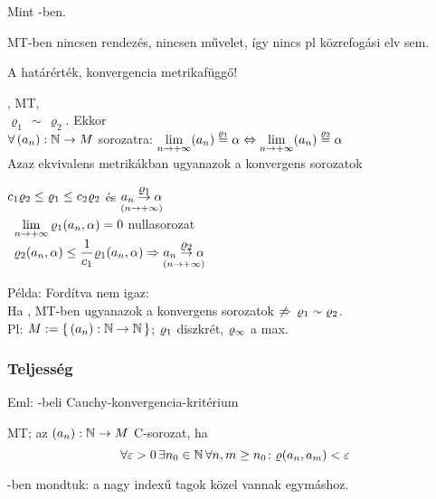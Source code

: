 \begin{biz}Mint \R-ben.
\end{biz}
\begin{Megj}
\item MT-ben nincsen rendezés, nincsen művelet, így nincs pl
  közrefogási elv sem.
\item A határérték, konvergencia metrikafüggő!
\end{Megj}

\begin{te}, 
  MT, \\$\varrho_1\,\sim\,\varrho_2$. Ekkor\\
  $\forall\,(a_n): \mathbb{N}\to M$ sorozatra: $\displaystyle\lim_{n\to+\infty}(a_n)
  \stackrel{\varrho_1}{=} \alpha \Leftrightarrow
  \displaystyle\lim_{n\to+\infty}(a_n) \stackrel{\varrho_2}{=} \alpha$\\
  Azaz ekvivalens metrikákban ugyanazok a konvergens sorozatok   
\end{te}

\begin{biz}
  $c_1 \varrho_2 \leq \varrho_1\leq c_2\varrho_2$ és
  $\underset{(n\to+\infty)}{a_n\overset{\displaystyle\varrho_1}{\to}\alpha}$\\
  \nn\ $\displaystyle\lim_{n\to+\infty}\varrho_1(a_n,\alpha)=0$ nullasorozat\\
  \nn\ $\varrho_2(a_n,\alpha)\leq \dfrac1{c_1}\varrho_1(a_n,\alpha)
  \Rightarrow \underset{(n\to+\infty)}{a_n\overset{\displaystyle\varrho_2}{\to}\alpha}$ 
\end{biz}

Példa: Fordítva nem igaz:\\
Ha ,  MT-ben ugyanazok a konvergens sorozatok $\not\Rightarrow\,
\varrho_1\sim\varrho_2$.\\
Pl: $M:=\{\,(a_n):\mathbb{N}\to\mathbb{N}\,\}$; $\varrho_1$ diszkrét, $\varrho_\infty$ a max.\\

\subsubsection{Teljesség}
Eml: \R-beli Cauchy-konvergencia-kritérium  
\begin{de}
  \MT MT; az $(a_n): \mathbb{N}\to M$ C-sorozat, ha 
  \[\forall \varepsilon >0\, \exists n_0\in \mathbb{N}\, \forall n,m\geq
  n_0\colon \varrho(a_n,a_m)<\varepsilon\]
\end{de}
\begin{megj}
  \R-ben mondtuk: a nagy indexű tagok közel vannak egymáshoz.
\end{megj}

